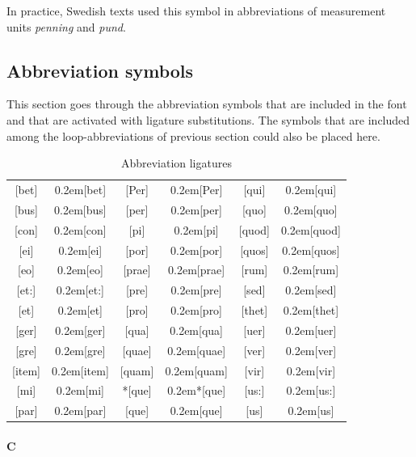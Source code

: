 \documentclass[a4paper]{article}
\newcommand{\samplefont}{\fontsize{16}{16}\abcursivefamily\spaceskip0.2em}
\newcommand{\sample}[1]{{\samplefont #1 \strut}}
\begin{document}
In practice, Swedish texts used this symbol in abbreviations of
measurement units \emph{penning} and \emph{pund}.

\subsection{Abbreviation symbols}

This section goes through the abbreviation symbols that are included
in the font and that are activated with ligature substitutions. The
symbols that are included among the loop-abbreviations of previous
section could also be placed here.

\begin{table}
  \centering

  \begin{tabular}{cccccc}
{}[bet] & \sample{[bet]}   & [Per] & \sample{[Per]}   & [qui] & \sample{[qui]}  \\
{}[bus] & \sample{[bus]}   & [per] & \sample{[per]}   & [quo] & \sample{[quo]}  \\
{}[con] & \sample{[con]}   & [pi] & \sample{[pi]}     & [quod] & \sample{[quod]}  \\
{}[ei] & \sample{[ei]}     & [por] & \sample{[por]}   & [quos] & \sample{[quos]}  \\
{}[eo] & \sample{[eo]}     & [prae] & \sample{[prae]} & [rum] & \sample{[rum]}  \\
{}[et:] & \sample{[et:]}   & [pre] & \sample{[pre]}   & [sed] & \sample{[sed]}  \\ 
{}[et] & \sample{[et]}     & [pro] & \sample{[pro]}   & [thet] & \sample{[thet]}  \\
{}[ger] & \sample{[ger]}   & [qua] & \sample{[qua]}   & [uer] & \sample{[uer]}  \\
{}[gre] & \sample{[gre]}   & [quae] & \sample{[quae]} & [ver] & \sample{[ver]} \\
{}[item] & \sample{[item]} & [quam] & \sample{[quam]} & [vir] & \sample{[vir]} \\
{}[mi] & \sample{[mi]}     & *[que] & \sample{*[que]} & [us:] & \sample{[us:]}  \\
{}[par] & \sample{[par]}   & [que] & \sample{[que]}   & [us] & \sample{[us]}  \\
  \end{tabular}
  \caption{Abbreviation ligatures}\label{tab:abbreviation_ligatures}
  
\end{table}

\paragraph{C}
\end{document}
